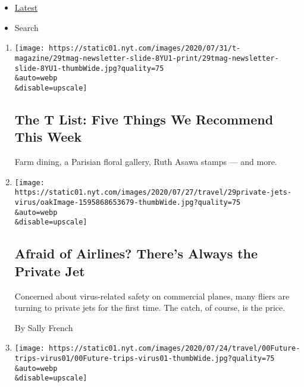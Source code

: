 \begin{itemize}
\tightlist
\item
  \protect\hyperlink{stream-panel}{Latest}
\item
  Search
\end{itemize}

\begin{enumerate}
\def\labelenumi{\arabic{enumi}.}
\item
  \href{/2020/07/30/t-magazine/the-t-list-five-things-we-recommend-this-week.html}{}

  \texttt{[image: https://static01.nyt.com/images/2020/07/31/t-magazine/29tmag-newsletter-slide-8YU1-print/29tmag-newsletter-slide-8YU1-thumbWide.jpg?quality=75\\\&auto=webp\\\&disable=upscale]}

  \hypertarget{the-t-list-five-things-we-recommend-this-week}{%
  \subsection{The T List: Five Things We Recommend This
  Week}\label{the-t-list-five-things-we-recommend-this-week}}

  Farm dining, a Parisian floral gallery, Ruth Asawa stamps --- and
  more.
\item
  \href{/2020/07/30/travel/private-jets-coronavirus.html}{}

  \texttt{[image: https://static01.nyt.com/images/2020/07/27/travel/29private-jets-virus/oakImage-1595868653679-thumbWide.jpg?quality=75\\\&auto=webp\\\&disable=upscale]}

  \hypertarget{afraid-of-airlines-theres-always-the-private-jet}{%
  \subsection{Afraid of Airlines? There's Always the Private
  Jet}\label{afraid-of-airlines-theres-always-the-private-jet}}

  Concerned about virus-related safety on commercial planes, many fliers
  are turning to private jets for the first time. The catch, of course,
  is the price.

  By Sally French
\item
  \href{/2020/07/28/travel/future-travel-bucket-list-coronavirus.html}{}

  \texttt{[image: https://static01.nyt.com/images/2020/07/24/travel/00Future-trips-virus01/00Future-trips-virus01-thumbWide.jpg?quality=75\\\&auto=webp\\\&disable=upscale]}

  \hypertarget{longer-slower-farther-savoring-the-prospects-of-future-travels}{%
}
\end{enumerate}
